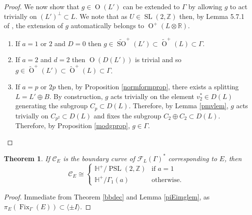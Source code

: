 \documentclass[11pt]{article}
\newtheorem{thm}{Theorem}[section]
\newcommand{\RR}{\mathbb{R}}
\newcommand{\ZZ}{\mathbb{Z}}
\newcommand{\HH}{\mathbb{H}}
\newcommand{\cc}{\mathcal{C}}
\newcommand{\fc}{\mathcal{F}}
\newcommand{\la}{\langle}
\newcommand{\ra}{\rangle}
\newcommand{\opn}{\operatorname}
\newcommand{\op}{\oplus}
\newcommand{\beq}{\begin{equation*}}
\newcommand{\eeq}{\end{equation*}}
\begin{document}
\begin{proof}
We now show  that $g \in \opn{O}(L')$ can be extended to $\Gamma$ by allowing $g$ to act trivially on $(L')^{\perp} \subset L$.
 We note that as $U \in \opn{SL}(2, \ZZ)$ then, by Lemma 5.7.1 of \cite{Brieskorn}, the extension of $g$ automatically belongs to $\opn{O}^+(L \otimes \RR)$.
 \begin{enumerate}
 \item If $a=1$ or $2$ and $D=0$ then $g \in \widetilde{\opn{SO}}^+(L') \subset \widetilde{\opn{O}}^+(L) \subset \Gamma$.
 \item If $a=2$ and $d=2$ then $\opn{O}(D(L'))$ is trivial and so $g \in \widetilde{\opn{O}}^+(L') \subset \widetilde{\opn{O}}^+(L) \subset \Gamma$.
 \item If $a=p$ or $2p$ then, by Proposition \ref{normformprop}, there exists a splitting $L = L' \op B$.
   By construction, $g$ acts trivially on the element $v_2^* \in D(L)$ generating the subgroup $C_p \subset D(L)$.
   Therefore, by Lemma \ref{pmvlem}, $g$ acts trivially on $C_{p^2} \subset D(L)$ and fixes the subgroup $C_2 \op C_2 \subset D(L)$.
   Therefore, by Proposition \ref{modgprop}, $g \in \Gamma$.
 \end{enumerate}
\end{proof}
\begin{thm}\label{curvethm}
  If $\cc_E$ is the boundary curve of $\fc_L(\Gamma)^*$ corresponding to $E$, then
  \beq
  \cc_E \cong
  \begin{cases}
    \HH^+/\opn{PSL}(2, \ZZ) & \text{if $a=1$} \\
    \HH^+/\Gamma_1(a) & \text{otherwise.}
    \end{cases}
  \eeq
\end{thm}
\begin{proof}
  Immediate from Theorem \ref{bbdec} and Lemma \ref{piEimglem}, as  $\pi_E(\opn{Fix}_{\Gamma}(E)) \subset \la \pm I \ra$.
\end{proof}
\end{document}
